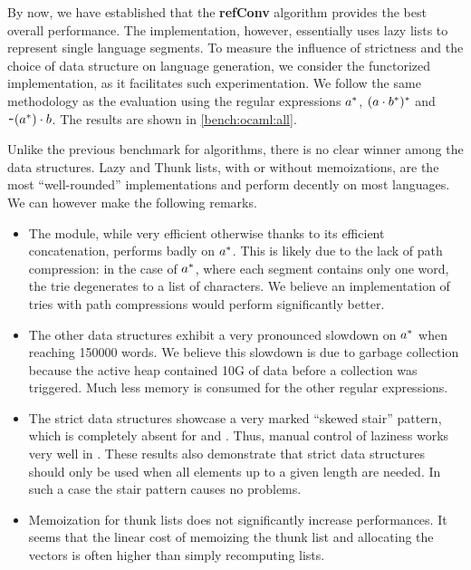 By now, we have established that the \textbf{refConv} algorithm
provides the best overall performance.  The \haskell implementation,
however, essentially uses lazy lists to represent single language
segments. To measure the influence of strictness and the choice of data structure on
language generation, we consider the functorized \ocaml implementation, as it facilitates such experimentation.
We follow the same methodology as the \haskell evaluation using the
regular expressions $a^*$, $(a \cdot{b^*})^*$ and
$\texttt{\textasciitilde}{(a^*)} \cdot{b}$.  The results are shown in
\cref{bench:ocaml:all}.

Unlike the previous benchmark for algorithms, there is no clear winner
among the data structures.
Lazy and Thunk lists, with or without memoizations, are the most ``well-rounded''
implementations and perform decently on most languages.
We can however make the following remarks.
\begin{itemize}[leftmargin=*]
\item The  module,
  while very efficient otherwise thanks to its efficient concatenation,
  performs badly on $a^*$.
  This is likely due to the lack of path compression:
  in the case of $a^*$, where each segment contains only one word, the
  trie degenerates to a list of characters.
  We believe an implementation of tries with path compressions would perform
  significantly better.
\item The other data structures exhibit a very pronounced slowdown on $a^*$
  when reaching 150000 words.
  We believe this slowdown is due to garbage collection because
  the active heap contained 10G of data before
  a collection was triggered. Much less memory is consumed for the other regular
  expressions.
\item The strict data structures showcase a very marked ``skewed
  stair'' pattern, which is completely absent for  and
  . Thus, manual control of laziness works very well in
  \ocaml. These results also demonstrate that strict data structures
  should only be used when all elements up to a given length are
  needed. In such a case the stair pattern causes no problems.
\item Memoization for thunk lists does not significantly increase performances.
  It seems that the linear cost of memoizing the thunk list and
  allocating the vectors
  is often higher than simply recomputing lists.
\end{itemize}


